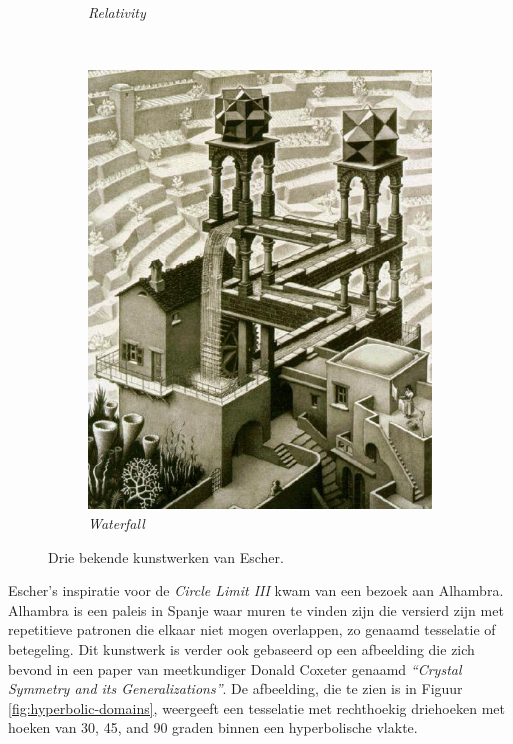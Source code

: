 \documentclass{article}
\begin{document}
\begin{figure}[h]
\begin{subfigure}{0.33\textwidth}
                \caption{\textit{Relativity}}
        \end{subfigure}%
        ~ 
        \begin{subfigure}{0.33\textwidth}
                \includegraphics[width=\textwidth]{Escher_Waterfall}
                \caption{\textit{Waterfall}}
        \end{subfigure}%
        \caption{Drie bekende kunstwerken van Escher.}
        \label{fig:structCompare}
\end{figure}

\noindent Escher's inspiratie voor de \textit{Circle Limit III} kwam van een bezoek aan Alhambra. Alhambra is een paleis in Spanje waar muren te vinden zijn die versierd zijn met repetitieve patronen die elkaar niet mogen overlappen, zo genaamd tesselatie of betegeling. Dit kunstwerk is verder ook gebaseerd op een afbeelding die zich bevond in een paper van meetkundiger Donald Coxeter genaamd \textit{``Crystal Symmetry and its Generalizations''}. De afbeelding, die te zien is in Figuur \ref{fig:hyperbolic-domains}, weergeeft een tesselatie met rechthoekig driehoeken met hoeken van 30, 45, and 90 graden binnen een hyperbolische vlakte. 
\end{document}

